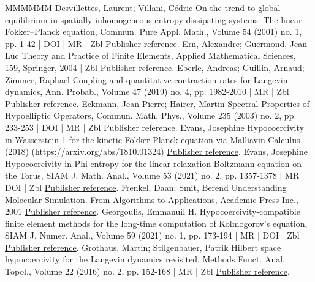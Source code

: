 \documentclass[10pt,a4paper]{article}
\numberwithin{equation}{section}
\begin{document}
\begin{thebibliography}{MMMMMM}
 Desvillettes, Laurent; Villani, Cédric On the trend to global equilibrium in spatially inhomogeneous entropy-dissipating systems: The linear Fokker–Planck equation, Commun. Pure Appl. Math., Volume 54 (2001) no. 1, pp. 1-42 | DOI | MR | Zbl \href{https://ahl.centre-mersenne.org/item/AHL_2022__5__523_0/#DV01}{Publisher reference}.
 Ern, Alexandre; Guermond, Jean-Luc Theory and Practice of Finite Elements, Applied Mathematical Sciences, 159, Springer, 2004 | Zbl \href{https://ahl.centre-mersenne.org/item/AHL_2022__5__523_0/#ern2013theory}{Publisher reference}.
 Eberle, Andreas; Guillin, Arnaud; Zimmer, Raphael Coupling and quantitative contraction rates for Langevin dynamics, Ann. Probab., Volume 47 (2019) no. 4, pp. 1982-2010 | MR | Zbl \href{https://ahl.centre-mersenne.org/item/AHL_2022__5__523_0/#EGZ19}{Publisher reference}.
 Eckmann, Jean-Pierre; Hairer, Martin Spectral Properties of Hypoelliptic Operators, Commun. Math. Phys., Volume 235 (2003) no. 2, pp. 233-253 | DOI | MR | Zbl \href{https://ahl.centre-mersenne.org/item/AHL_2022__5__523_0/#EH03}{Publisher reference}.
 Evans, Josephine Hypocoercivity in Wasserstein-1 for the kinetic Fokker-Planck equation via Malliavin Calculus (2018) (https://arxiv.org/abs/1810.01324) \href{https://ahl.centre-mersenne.org/item/AHL_2022__5__523_0/#Ev18}{Publisher reference}.
 Evans, Josephine Hypocoercivity in Phi-entropy for the linear relaxation Boltzmann equation on the Torus, SIAM J. Math. Anal., Volume 53 (2021) no. 2, pp. 1357-1378 | MR | DOI | Zbl \href{https://ahl.centre-mersenne.org/item/AHL_2022__5__523_0/#Ev17}{Publisher reference}.
 Frenkel, Daan; Smit, Berend Understanding Molecular Simulation. From Algorithms to Applications, Academic Press Inc., 2001 \href{https://ahl.centre-mersenne.org/item/AHL_2022__5__523_0/#FrenkelSmit}{Publisher reference}.
 Georgoulis, Emmanuil H. Hypocoercivity-compatible finite element methods for the long-time computation of Kolmogorov’s equation, SIAM J. Numer. Anal., Volume 59 (2021) no. 1, pp. 173-194 | MR | DOI | Zbl \href{https://ahl.centre-mersenne.org/item/AHL_2022__5__523_0/#Georg18}{Publisher reference}.
 Grothaus, Martin; Stilgenbauer, Patrik Hilbert space hypocoercivity for the Langevin dynamics revisited, Methods Funct. Anal. Topol., Volume 22 (2016) no. 2, pp. 152-168 | MR | Zbl \href{https://ahl.centre-mersenne.org/item/AHL_2022__5__523_0/#GS16}{Publisher reference}.

\end{thebibliography}
\end{document}
